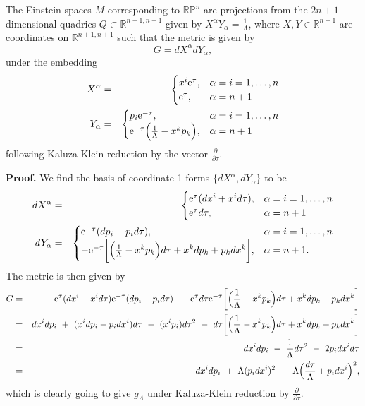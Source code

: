 \begin{prop}
The Einstein spaces $M$ corresponding to $\mathbb{RP}^{n}$
are projections from the $2n+1$-dimensional quadrics $Q\subset\mathbb{R}^{n+1,n+1}$
given by $X^{\alpha}Y_{\alpha}=\frac{1}{\Lambda}$, where $X,Y\in\mathbb{R}^{n+1}$
are coordinates on $\mathbb{R}^{n+1,n+1}$ such that the metric is
given by 
\[
G= dX^{\alpha} dY_{\alpha},
\]
 under the embedding
\begin{eqnarray}
X^{\alpha} & = & \begin{cases}
x^{i}\mathrm{e}^{\tau}, & \alpha=i=1,\dots,n\\
\mathrm{e}^{\tau}, & \alpha=n+1
\end{cases}\nonumber \\
Y_{\alpha} & = & \begin{cases}
p_{i}\mathrm{e}^{-\tau}, & \alpha=i=1,\dots,n\\
\mathrm{e}^{-\tau}\Bigl(\frac{1}{\Lambda}-x^{k}p_{k}\Bigr), & \alpha=n+1
\end{cases}\label{eq:embedding-1}
\end{eqnarray}
following Kaluza-Klein reduction by the vector $\frac{\partial}{\partial\tau}.$
\end{prop}
\textbf{Proof. }We find the basis of coordinate 1-forms $\{ dX^{\alpha}, dY_{\alpha}\}$
to be
\begin{eqnarray*}
 dX^{\alpha} & = & \begin{cases}
\mathrm{e}^{\tau}( dx^{i}+x^{i} d\tau), & \alpha=i=1,\dots,n\\
\mathrm{e}^{\tau} d\tau, & \alpha=n+1
\end{cases}\\
 dY_{\alpha} & = & \begin{cases}
\mathrm{e}^{-\tau}( dp_{i}-p_{i} d\tau), & \alpha=i=1,\dots,n\\
-\mathrm{e}^{-\tau}\biggl[\Bigl(\frac{1}{\Lambda}-x^{k}p_{k}\Bigr) d\tau+x^{k} dp_{k}+p_{k} dx^{k}\biggr], & \alpha=n+1.
\end{cases}
\end{eqnarray*}
The metric is then given by
\begin{eqnarray*}
G & = & \mathrm{e}^{\tau}( dx^{i}+x^{i} d\tau)\mathrm{e}^{-\tau}( dp_{i}-p_{i} d\tau)\ -\ \mathrm{e}^{\tau} d\tau\mathrm{e}^{-\tau}\biggl[\Bigl(\frac{1}{\Lambda}-x^{k}p_{k}\Bigr) d\tau+x^{k} dp_{k}+p_{k} dx^{k}\biggr]\\
 & = &  dx^{i} dp_{i}\ +\ (x^{i} dp_{i}-p_{i} dx^{i}) d\tau\ -\ (x^{i}p_{i}) d\tau^{2}\ -\  d\tau\biggl[\Bigl(\frac{1}{\Lambda}-x^{k}p_{k}\Bigr) d\tau+x^{k} dp_{k}+p_{k} dx^{k}\biggr]\\
 & = &  dx^{i} dp_{i}\ -\ \frac{1}{\Lambda} d\tau^{2}\ -\ 2p_{i} dx^{i} d\tau\\
 & = &  dx^{i} dp_{i}\ +\ \Lambda(p_{i} dx^{i})^{2}\ -\ \Lambda\Bigl(\frac{ d\tau}{\Lambda}+p_{i} dx^{i}\Bigr)^{2},
\end{eqnarray*}
which is clearly going to give $g_{\Lambda}$ under Kaluza-Klein reduction
by $\frac{\partial}{\partial\tau}$.
\koniec


